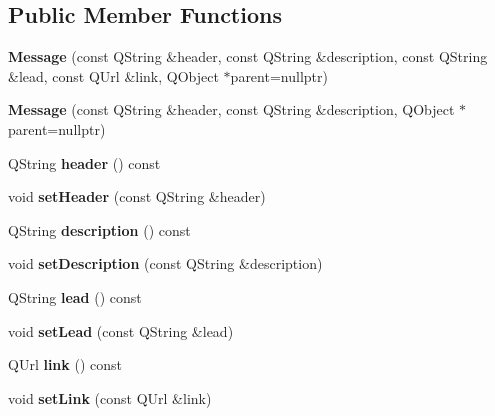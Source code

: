 \subsection*{Public Member Functions}
\begin{DoxyCompactItemize}
\item 
\mbox{\label{classAlertsEngine_1_1Message_aa5678fba37f1eb3917b639dba45649bd}} 
{\bfseries Message} (const Q\+String \&header, const Q\+String \&description, const Q\+String \&lead, const Q\+Url \&link, Q\+Object $\ast$parent=nullptr)
\item 
\mbox{\label{classAlertsEngine_1_1Message_a5cd29b13fa9414b81b40746f13c8a8f6}} 
{\bfseries Message} (const Q\+String \&header, const Q\+String \&description, Q\+Object $\ast$parent=nullptr)
\item 
\mbox{\label{classAlertsEngine_1_1Message_abe2167f76ca26a33049b9c4161bb3f70}} 
Q\+String {\bfseries header} () const
\item 
\mbox{\label{classAlertsEngine_1_1Message_a1b6364415df2677d4f2f97ba4a60fbc6}} 
void {\bfseries set\+Header} (const Q\+String \&header)
\item 
\mbox{\label{classAlertsEngine_1_1Message_a9179c8055fbaf7dc8d435831dd22faab}} 
Q\+String {\bfseries description} () const
\item 
\mbox{\label{classAlertsEngine_1_1Message_ac06351f3c3e17a03f6ee34e9c2a24752}} 
void {\bfseries set\+Description} (const Q\+String \&description)
\item 
\mbox{\label{classAlertsEngine_1_1Message_a5a1769dd0d4add541246bab3c33b4008}} 
Q\+String {\bfseries lead} () const
\item 
\mbox{\label{classAlertsEngine_1_1Message_a5ded2d853725b517bda49bdae59f26ee}} 
void {\bfseries set\+Lead} (const Q\+String \&lead)
\item 
\mbox{\label{classAlertsEngine_1_1Message_aea81d49a5b776d58e9dbee8ac1708e84}} 
Q\+Url {\bfseries link} () const
\item 
\mbox{\label{classAlertsEngine_1_1Message_a1a8aaf9ec0c56af40d418318e0340b54}} 
void {\bfseries set\+Link} (const Q\+Url \&link)
\end{DoxyCompactItemize}
